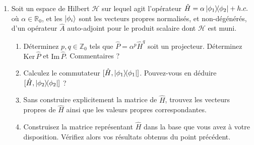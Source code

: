 \begin{enumerate}
\item Soit un espace de Hilbert $\mathscr H$ sur lequel agit l'opérateur $\hat H = \alpha \ketbra{\phi_1}{\phi_2} + h.c.$ où $\alpha\in\mathbb R_0$, et les $\ket{\phi_i}$ sont les vecteurs propres normalisés, et non-dégénérés, d'un opérateur $\hat A$ auto-adjoint pour le produit scalaire dont $\mathscr H$ est muni.
\begin{enumerate}
\item Déterminez $p,q\in\mathbb Z_0$ tels que $\hat P = \alpha^p \hat H^q$ soit un projecteur. Déterminez $\text{Ker}\,\hat P$ et $\text{Im}\, \hat P$. Commentaires ?
\item Calculez le commutateur $[\hat H,\ketbra{\phi_1}{\phi_1}]$. Pouvez-vous en déduire $[\hat H,\ketbra{\phi_2}{\phi_2}]$ ?
\item Sans construire explicitement la matrice de $\hat H$, trouvez les vecteurs propres de $\hat H$ ainsi que les valeurs propres correspondantes.
\item Construisez la matrice représentant $\hat H$ dans la base que vous avez à votre disposition. Vérifiez alors vos résultats obtenus du point précédent.
\end{enumerate}

\end{enumerate}

	
